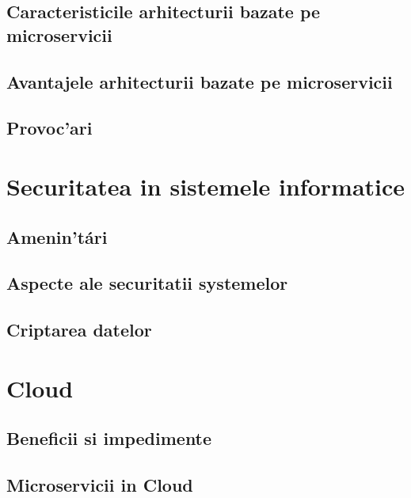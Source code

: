 \documentclass[12pt,a4paper,twoside]{report}
\begin{document}
\subsection{Caracteristicile arhitecturii bazate pe microservicii}

\subsection{Avantajele arhitecturii bazate pe microservicii}

\subsection{Provoc'ari} 

\section{Securitatea in sistemele informatice}

\subsection{Amenin'tári}

\subsection{Aspecte ale securitatii systemelor}

\subsection{Criptarea datelor}

\section{Cloud}

\subsection{Beneficii si impedimente}

\subsection{Microservicii in Cloud}
\end{document}
